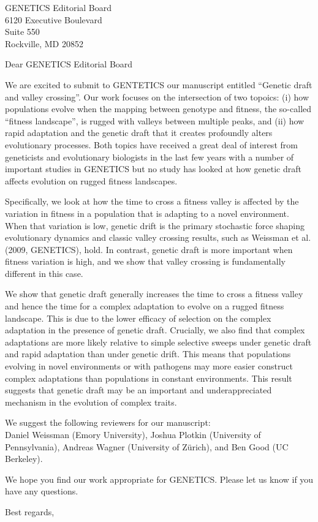 \documentclass[kentucky,10pt,foldmarks=off,backaddress=false,refline=dateleft,letterpaper]{scrlttr2}
\begin{document}
\begin{letter}{
    GENETICS Editorial Board\\
    6120 Executive Boulevard\\
    Suite 550\\
    Rockville, MD 20852}

\opening{Dear GENETICS Editorial Board}


We are excited to submit to GENTETICS our manuscript entitled ``Genetic draft and valley crossing''. Our work focuses on the intersection of two topoics: (i) how populations evolve when the mapping between genotype and fitness, the so-called ``fitness landscape'', is rugged with valleys between multiple peaks, and (ii) how rapid adaptation and the genetic draft that it creates profoundly alters evolutionary processes. Both topics have received a great deal of interest from geneticists and evolutionary biologists in the last few years with a number of important studies in GENETICS but no study has looked at how genetic draft affects evolution on rugged fitness landscapes.

Specifically, we look at how the time to cross a fitness valley is affected by the variation in fitness in a population that is adapting to a novel environment. When that variation is low, genetic drift is the primary stochastic force shaping evolutionary dynamics and classic valley crossing results, such as Weissman et al. (2009, GENETICS), hold. In contrast, genetic draft is more important when fitness variation is high, and we show that valley crossing is fundamentally different in this case.

We show that genetic draft generally increases the time to cross a fitness valley and hence the time for a complex adaptation to evolve on a rugged fitness landscape. This is due to the lower efficacy of selection on the complex adaptation in the presence of genetic draft. Crucially, we also find that complex adaptations are more likely relative to simple selective sweeps under genetic draft and rapid adaptation than under genetic drift. This means that populations evolving in novel environments or with pathogens may more easier construct complex adaptations than populations in constant environments. This result suggests that genetic draft may be an important and underappreciated mechanism in the evolution of complex traits.

We suggest the following reviewers for our manuscript:\\
Daniel Weissman (Emory University), Joshua Plotkin (University of Pennsylvania), Andreas Wagner (University of Zürich), and Ben Good (UC Berkeley).

We hope you find our work appropriate for GENETICS. Please let us know if you have any questions.

\closing{Best regards,}

\end{letter}
\end{document}
